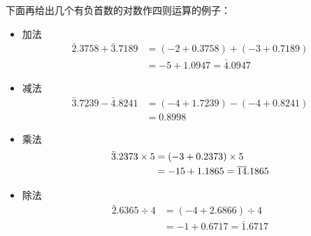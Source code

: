 下面再给出几个有负首数的对数作四则运算的例子：
\begin{itemize}
    \item 加法\[\begin{split}
    \bar{2}.3758+\bar{3}.7189&=(-2+0.3758)+(-3+0.7189)\\
&=-5+1.0947=\bar{4}.0947
\end{split}\]
    \item 减法\[\begin{split}
    \bar{3}.7239-\bar{4}.8241&=(-4+1.7239)-(-4+0.8241)\\
&=0.8998
\end{split}\]
    \item 乘法\[\begin{split}
 \bar{3}.2373\times5&=(-3+0.2373)\times5\\
&=-15+1.1865=\overline{14}.1865   
\end{split}\]
    \item 除法\[\begin{split}
\bar{2}.6365\div 4&=(-4+2.6866)\div 4\\
&=-1+0.6717=\bar{1}.6717
\end{split}\]
\end{itemize}

